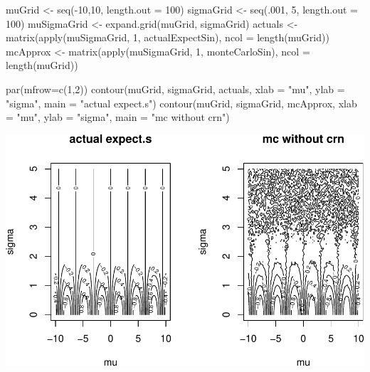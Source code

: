 \documentclass[
  12pt,
]{krantz}
\makeatletter
\newenvironment{Shaded}{\begin{snugshade}}{\end{snugshade}}
\newcommand{\AttributeTok}[1]{\textcolor[rgb]{0.61,0.61,0.61}{#1}}
\newcommand{\DecValTok}[1]{\textcolor[rgb]{0.06,0.06,0.06}{#1}}
\newcommand{\FunctionTok}[1]{\textcolor[rgb]{0,0,0}{#1}}
\newcommand{\NormalTok}[1]{#1}
\newcommand{\OtherTok}[1]{\textcolor[rgb]{0.37,0.37,0.37}{#1}}
\newcommand{\SpecialCharTok}[1]{\textcolor[rgb]{0,0,0}{#1}}
\newcommand{\StringTok}[1]{\textcolor[rgb]{0.5,0.5,0.5}{#1}}
\newenvironment{kframe}{%
\medskip{}
\setlength{\fboxsep}{.8em}
 \def\at@end@of@kframe{}%
 \ifinner\ifhmode%
  \def\at@end@of@kframe{\end{minipage}}%
  \begin{minipage}{\columnwidth}%
 \fi\fi%
 \def\FrameCommand##1{\hskip\@totalleftmargin \hskip-\fboxsep
 \colorbox{shadecolor}{##1}\hskip-\fboxsep
     \hskip-\linewidth \hskip-\@totalleftmargin \hskip\columnwidth}%
 \MakeFramed {\advance\hsize-\width
   \@totalleftmargin\z@ \linewidth\hsize
   \@setminipage}}%
 {\par\unskip\endMakeFramed%
 \at@end@of@kframe}
\renewenvironment{Shaded}{\begin{kframe}}{\end{kframe}}
\makeatother
\begin{document}
\begin{Shaded}
\begin{Highlighting}[]
\NormalTok{muGrid }\OtherTok{\textless{}{-}} \FunctionTok{seq}\NormalTok{(}\SpecialCharTok{{-}}\DecValTok{10}\NormalTok{,}\DecValTok{10}\NormalTok{, }\AttributeTok{length.out =} \DecValTok{100}\NormalTok{)}
\NormalTok{sigmaGrid }\OtherTok{\textless{}{-}} \FunctionTok{seq}\NormalTok{(.}\DecValTok{001}\NormalTok{, }\DecValTok{5}\NormalTok{, }\AttributeTok{length.out =} \DecValTok{100}\NormalTok{)}
\NormalTok{muSigmaGrid }\OtherTok{\textless{}{-}} \FunctionTok{expand.grid}\NormalTok{(muGrid, sigmaGrid)}
\NormalTok{actuals }\OtherTok{\textless{}{-}}  \FunctionTok{matrix}\NormalTok{(}\FunctionTok{apply}\NormalTok{(muSigmaGrid, }\DecValTok{1}\NormalTok{, actualExpectSin), }\AttributeTok{ncol =} \FunctionTok{length}\NormalTok{(muGrid))}
\NormalTok{mcApprox }\OtherTok{\textless{}{-}} \FunctionTok{matrix}\NormalTok{(}\FunctionTok{apply}\NormalTok{(muSigmaGrid, }\DecValTok{1}\NormalTok{, monteCarloSin), }\AttributeTok{ncol =} \FunctionTok{length}\NormalTok{(muGrid))}

\FunctionTok{par}\NormalTok{(}\AttributeTok{mfrow=}\FunctionTok{c}\NormalTok{(}\DecValTok{1}\NormalTok{,}\DecValTok{2}\NormalTok{))}
\FunctionTok{contour}\NormalTok{(muGrid, sigmaGrid, actuals, }\AttributeTok{xlab =} \StringTok{"mu"}\NormalTok{, }\AttributeTok{ylab =} \StringTok{"sigma"}\NormalTok{, }\AttributeTok{main =} \StringTok{"actual expect.s"}\NormalTok{)}
\FunctionTok{contour}\NormalTok{(muGrid, sigmaGrid, mcApprox, }\AttributeTok{xlab =} \StringTok{"mu"}\NormalTok{, }\AttributeTok{ylab =} \StringTok{"sigma"}\NormalTok{, }\AttributeTok{main =} \StringTok{"mc without crn"}\NormalTok{)}
\end{Highlighting}
\end{Shaded}

\includegraphics{r_and_python_book_files/figure-latex/unnamed-chunk-240-1.pdf}
\end{document}
